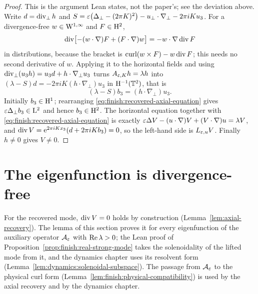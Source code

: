 \begin{proof}
  \leanok
  This is the argument Lean states, not the paper's; see the deviation
  above.  Write $d=\operatorname{div}_\perp h$ and
  $S=\varepsilon\bigl(\Delta_\perp-(2\pi K)^2\bigr)-u_\perp\cdot\nabla_\perp-2\pi iKu_3$.  For a divergence-free
  $w\in\mathrm{W}^{1,\infty}$ and $F\in\mathrm{H}^2$,
  \begin{equation}
    \operatorname{div}\bigl[-(w\cdot\nabla)F+(F\cdot\nabla)w\bigr]=-w\cdot\nabla\operatorname{div} F
    \label{eq:finish:transport-stretching-divergence}
  \end{equation}
  in distributions, because the bracket is $\operatorname{curl}(w\times F)-w\operatorname{div} F$; this needs no second
  derivative of $w$.  Applying it to the horizontal fields and using
  $\operatorname{div}_\perp(u_3h)=u_3d+h\cdot\nabla_\perp u_3$ turns $A_{\varepsilon,K}h=\lambda h$ into
  $(\lambda-S)d=-2\pi iK(h\cdot\nabla_\perp)u_3$ in $\mathrm{H}^{-1}(\mathbb{T}^2)$, that is
  \begin{equation}
    (\lambda-S)b_3=(h\cdot\nabla_\perp)u_3 .
    \label{eq:finish:recovered-axial-equation}
  \end{equation}
  Initially $b_3\in\mathrm{H}^1$; rearranging \eqref{eq:finish:recovered-axial-equation} gives
  $\varepsilon\Delta_\perp b_3\in\mathrm{L}^2$ and hence $b_3\in\mathrm{H}^2$.  The horizontal equation together
  with \eqref{eq:finish:recovered-axial-equation} is exactly
  $\varepsilon\Delta V-(u\cdot\nabla)V+(V\cdot\nabla)u=\lambda V$, and
  $\operatorname{div} V=\mathrm{e}^{2\pi iKx_3}(d+2\pi iKb_3)=0$, so the left-hand side is $L_{\varepsilon,u}V$.  Finally $h\neq0$
  gives $V\neq0$.
\end{proof}

\section{The eigenfunction is divergence-free}

For the recovered mode, $\operatorname{div} V=0$ holds by construction (Lemma~\ref{lem:axial-recovery}).
The lemma of this section proves it for every eigenfunction of the auxiliary operator
$\mathcal{A}_\varepsilon$ with $\operatorname{Re}\lambda>0$; the Lean proof of
Proposition~\ref{prop:finish:real-strong-mode} takes the solenoidality of the lifted mode
from it, and the dynamics chapter uses its resolvent form
(Lemma~\ref{lem:dynamics:solenoidal-subspace}).  The passage from $\mathcal{A}_\varepsilon$ to the
physical curl form (Lemma~\ref{lem:finish:physical-compatibility}) is used by the axial
recovery and by the dynamics chapter.

